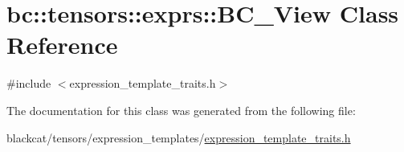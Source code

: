 \hypertarget{classbc_1_1tensors_1_1exprs_1_1BC__View}{}\section{bc\+:\+:tensors\+:\+:exprs\+:\+:B\+C\+\_\+\+View Class Reference}
\label{classbc_1_1tensors_1_1exprs_1_1BC__View}


{\ttfamily \#include $<$expression\+\_\+template\+\_\+traits.\+h$>$}



The documentation for this class was generated from the following file\+:\begin{DoxyCompactItemize}
\item 
blackcat/tensors/expression\+\_\+templates/\hyperlink{expression__template__traits_8h}{expression\+\_\+template\+\_\+traits.\+h}\end{DoxyCompactItemize}
